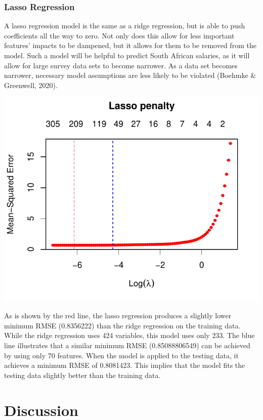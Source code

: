 \documentclass[11pt,preprint, authoryear]{elsarticle}
\numberwithin{equation}{section}
\numberwithin{figure}{section}
\numberwithin{table}{section}
\begin{document}
\hypertarget{lasso-regression}{%
\subsubsection{Lasso Regression}\label{lasso-regression}}

A lasso regression model is the same as a ridge regression, but is able
to push coefficients all the way to zero. Not only does this allow for
less important features' impacts to be dampened, but it allows for them
to be removed from the model. Such a model will be helpful to predict
South African salaries, as it will allow for large survey data sets to
become narrower. As a data set becomes narrower, necessary model
assumptions are less likely to be violated (Boehmke \& Greenwell, 2020).

\begin{center}\includegraphics{MLPDF_files/figure-latex/unnamed-chunk-11-1} \end{center}

As is shown by the red line, the lasso regression produces a slightly
lower minimum RMSE (0.8356222) than the ridge regression on the training
data. While the ridge regression uses 424 variables, this model uses
only 233. The blue line illustrates that a similar minimum RMSE
(0.85088806549) can be achieved by using only 70 features. When the
model is applied to the testing data, it achieves a minimum RMSE of
0.8081423. This implies that the model fits the testing data slightly
better than the training data.

\hypertarget{discussion}{%
\section{Discussion}\label{discussion}}
\end{document}
